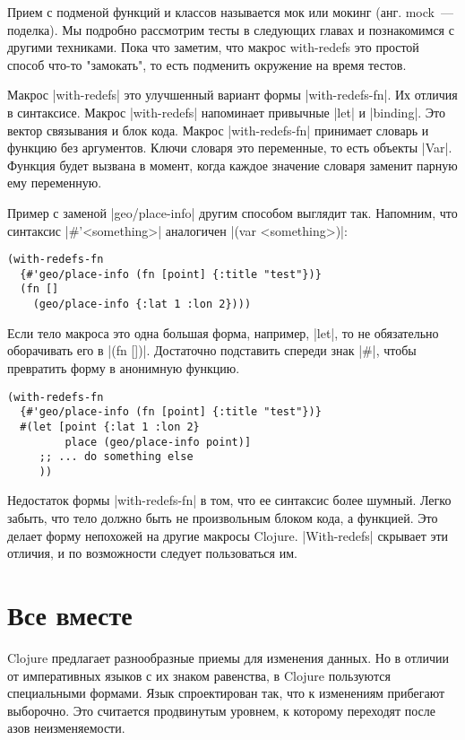 {{{{{{{{Прием с подменой функций и классов называется мок или мокинг (анг. mock~---
поделка). Мы подробно рассмотрим тесты в следующих главах и познакомимся с
другими техниками. Пока что заметим, что макрос with-redefs это простой способ
что-то "замокать", то есть подменить окружение на время тестов.

Макрос \spverb|with-redefs| это улучшенный вариант формы \spverb|with-redefs-fn|. Их отличия в
синтаксисе. Макрос \spverb|with-redefs| напоминает привычные \spverb|let| и \spverb|binding|. Это
вектор связывания и блок кода. Макрос \spverb|with-redefs-fn| принимает словарь и
функцию без аргументов. Ключи словаря это переменные, то есть объекты
\spverb|Var|. Функция будет вызвана в момент, когда каждое значение словаря заменит
парную ему переменную.

Пример с заменой \spverb|geo/place-info| другим способом выглядит так. Напомним, что
синтаксис \spverb|#'<something>| аналогичен \spverb|(var <something>)|:

\begin{verbatim}
(with-redefs-fn
  {#'geo/place-info (fn [point] {:title "test"})}
  (fn []
    (geo/place-info {:lat 1 :lon 2})))
\end{verbatim}

Если тело макроса это одна большая форма, например, \spverb|let|, то не обязательно
оборачивать его в \spverb|(fn [])|. Достаточно подставить спереди знак \spverb|#|, чтобы
превратить форму в анонимную функцию.

\begin{verbatim}
(with-redefs-fn
  {#'geo/place-info (fn [point] {:title "test"})}
  #(let [point {:lat 1 :lon 2}
         place (geo/place-info point)]
     ;; ... do something else
     ))
\end{verbatim}

Недостаток формы \spverb|with-redefs-fn| в том, что ее синтаксис более шумный. Легко
забыть, что тело должно быть не произвольным блоком кода, а функцией. Это делает
форму непохожей на другие макросы Clojure. \spverb|With-redefs| скрывает эти отличия, и
по возможности следует пользоваться им.

\section{Все вместе}

Clojure предлагает разнообразные приемы для изменения данных. Но в отличии от
императивных языков с их знаком равенства, в Clojure пользуются специальными
формами. Язык спроектирован так, что к изменениям прибегают выборочно. Это
считается продвинутым уровнем, к которому переходят после азов неизменяемости.

}}}}}}}}
